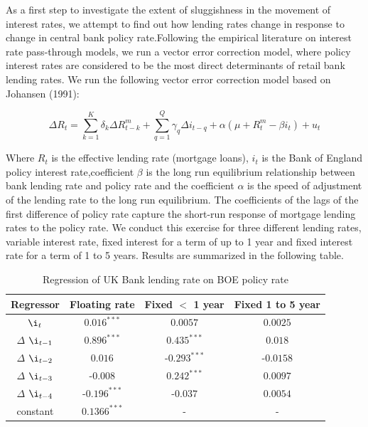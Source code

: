 \documentclass[12pt]{article}
\numberwithin{equation}{section}
\begin{document}
As a first step to investigate the extent of sluggishness in the movement of interest rates, we attempt  to find out how lending rates change in response to change in central bank policy rate.Following the empirical literature on interest rate pass-through models, we run a vector error correction model, where policy interest rates  are considered to be the most direct determinants of retail bank lending rates. We run the following vector error correction model based on Johansen (1991): 

\begin{equation}
{\Delta}R_{t}=\sum _{k=1}^{K }\delta_{k}{\Delta}R^m_{t-k}+\sum _{q=1}^{Q }\gamma_{q}{\Delta}i_{t-q}+\alpha (\mu+R^m_{t}-\beta i_{t})+u_{t}	
\end{equation}

Where $R_{t}$ is the effective lending rate (mortgage loans), $i_{t}$ is the Bank of England policy interest rate,coefficient $\beta$ is the long run equilibrium relationship between bank lending rate and policy rate and the coefficient $\alpha$ is the speed of adjustment of the lending rate to the long run equilibrium. The coefficients of the lags of the first difference of policy rate capture the short-run response of mortgage lending rates to the policy rate. We conduct this exercise for three different lending rates, variable interest rate, fixed interest for a term of up to 1 year and fixed interest rate for a term of 1 to 5 years. Results are summarized in the following table.


\begin {table}[H]
\caption {Regression of UK Bank lending rate on BOE policy rate} \label{tab:title} 
\begin{center}
	\begin{tabular}{||c c c c  ||} 
		\hline
		Regressor & Floating rate & Fixed $<$ 1 year& Fixed 1 to 5 year \\ [0.5ex] 
		\hline\hline
		$\i_{t}$ & $0.016^{***}$ & $0.0057$& $0.0025$ \\ 
		\hline
		$\Delta$ $\i_{t-1}$& $0.896^{***}$ & $0.435^{***}$& $0.018$  \\ 
		\hline
		 $\Delta$ $\i_{t-2}$&$0.016$ & -$0.293^{***}$& -$0.0158$\\
		
		\hline
	$\Delta$ $\i_{t-3}$	&  -$0.008$ & $0.242^{***}$& $0.0097$ \\
		\hline
		$\Delta$  $\i_{t-4}$&-$0.196^{***}$ &-$0.037$& $0.0054$ \\  
		\hline
		constant&$0.1366^{***}$ & - & -\\ 
			
			\hline
		
		\hline
		
	\end{tabular}

\end{center}

\end {table}
\end{document}
